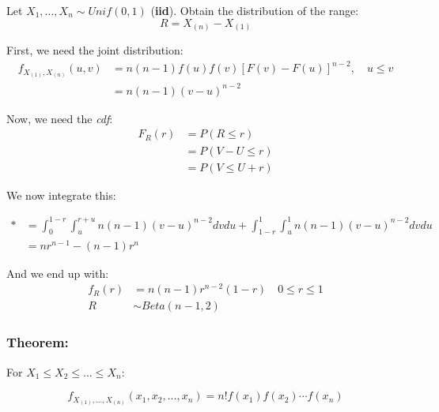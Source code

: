 \documentclass{article}
\begin{document}
Let $X_1,...,X_n \sim Unif(0,1)$ (\textbf{iid}). Obtain the distribution of the range:
\begin{equation*}
    R = X_{(n)} - X_{(1)}
\end{equation*}

First, we need the joint distribution:
\begin{equation*}
\begin{split}
    f_{X_{(1)},X_{(n)}} (u,v) &= n(n-1) f(u) f(v) [F(v)-F(u)]^{n-2}, \quad u \leq v\\
                                &= n(n-1)(v-u)^{n-2}
\end{split}
\end{equation*}

Now, we need the \textit{cdf}:
\begin{equation*}
    \begin{split}
        F_R(r)  &= P(R\leq r) \\
                &= P(V-U \leq r)\\
                &= P(V \leq U + r)
    \end{split}
\end{equation*}

We now integrate this:

\begin{equation*}
    \begin{split}
        * &= \int_{0}^{1-r} \int_{u}^{r+u} n(n-1)(v-u)^{n-2} dv du + \int_{1-r}^{1}\int_{u}^1 n(n-1)(v-u)^{n-2}dvdu\\
        &= n r^{n-1} - (n-1)r^n
    \end{split}
\end{equation*}

And we end up with:
\begin{equation*}
    \begin{split}
        f_R(r) &= n(n-1)r^{n-2}(1-r) \quad 0 \leq r \leq 1\\
        R &\sim Beta(n-1,2)
    \end{split}
\end{equation*}


\subsubsection*{Theorem:}

For $X_1 \leq X_2 \leq ... \leq X_n$:

\begin{equation*}
    f_{X_{(1)},...,X_{(n)}}(x_1,x_2,...,x_n) = n! f(x_1) f(x_2) \cdots f(x_n)
\end{equation*}
\end{document}
